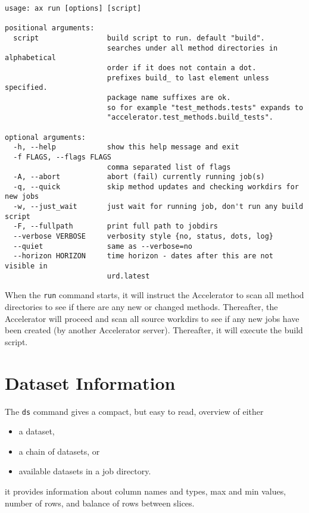 \begin{snugshade}
\begin{verbatim}
usage: ax run [options] [script]

positional arguments:
  script                build script to run. default "build".
                        searches under all method directories in alphabetical
                        order if it does not contain a dot.
                        prefixes build_ to last element unless specified.
                        package name suffixes are ok.
                        so for example "test_methods.tests" expands to
                        "accelerator.test_methods.build_tests".

optional arguments:
  -h, --help            show this help message and exit
  -f FLAGS, --flags FLAGS
                        comma separated list of flags
  -A, --abort           abort (fail) currently running job(s)
  -q, --quick           skip method updates and checking workdirs for new jobs
  -w, --just_wait       just wait for running job, don't run any build script
  -F, --fullpath        print full path to jobdirs
  --verbose VERBOSE     verbosity style {no, status, dots, log}
  --quiet               same as --verbose=no
  --horizon HORIZON     time horizon - dates after this are not visible in
                        urd.latest
\end{verbatim}
\end{snugshade}
When the \texttt{run} command starts, it will instruct the Accelerator
to scan all method directories to see if there are any new or changed
methods.  Thereafter, the Accelerator will proceed and scan all source
workdirs to see if any new jobs have been created (by another
Accelerator server).  Thereafter, it will execute the build script.




\section{Dataset Information}
The \texttt{ds} command gives a compact, but easy to read,
overview of either
\begin{itemize}
\item[] a dataset,
\item[] a chain of datasets, or
\item[] available datasets in a job directory.
\end{itemize}
it provides information about column names and types, max and min
values, number of rows, and balance of rows between slices.

